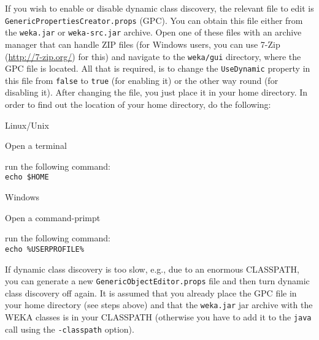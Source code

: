 If you wish to enable or disable dynamic class discovery, the relevant file to
edit is \verb=GenericPropertiesCreator.props= (GPC). You can obtain this file
either from the \texttt{weka.jar} or \texttt{weka-src.jar} archive. Open one of
these files with an archive manager that can handle ZIP files (for Windows
users, you can use 7-Zip (\url{http://7-zip.org/}{}) for this) and
navigate to the \texttt{weka/gui} directory, where the GPC file is located. All
that is required, is to change the \verb=UseDynamic= property in this file from
\verb=false= to \verb=true= (for enabling it) or the other way round (for
disabling it). After changing the file, you just place it in your home
directory. In order to find out the location of your home directory,
do the following:
\begin{tight_itemize}
	\item Linux/Unix
		\begin{tight_itemize}
 			\item Open a terminal
			\item run the following command: \\
			\texttt{echo \$HOME}
		\end{tight_itemize}
	\item Windows
		\begin{tight_itemize}
 			\item Open a command-primpt
			\item run the following command: \\
			\texttt{echo \%USERPROFILE\%}
		\end{tight_itemize}
\end{tight_itemize}
If dynamic class discovery is too slow, e.g., due to an enormous CLASSPATH, you
can generate a new \verb=GenericObjectEditor.props= file and then turn dynamic
class discovery off again. It is assumed that you already place the GPC file in
your home directory (see steps above) and that the \texttt{weka.jar} jar
archive with the WEKA classes is in your CLASSPATH (otherwise you have to add it
to the \texttt{java} call using the \texttt{-classpath} option). \\

